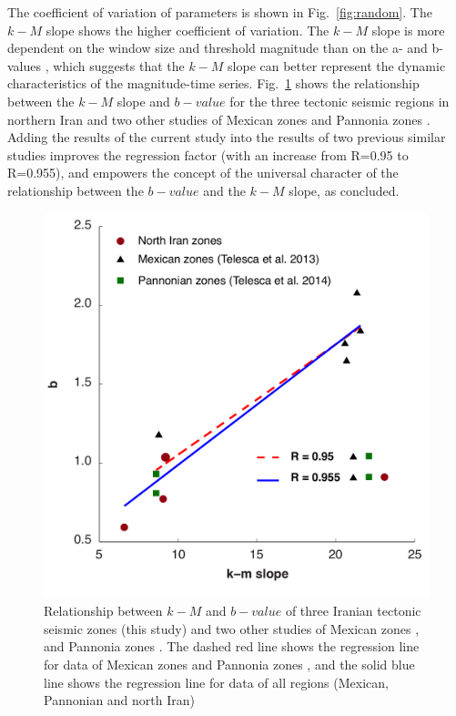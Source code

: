 \noindent
The coefficient of variation of parameters is shown in Fig.~\ref{fig:random}. The  $k-M$  slope shows the higher coefficient of variation. The  $k-M$  slope is more dependent on the window size and threshold magnitude than  on the a-  and  b-values , which suggests that  the $k-M$  slope can better represent the dynamic characteristics of the magnitude-time series. 
 \noindent
 Fig.~\ref{fig:regression} shows the relationship between the  $k-M$  slope and $b-value$ for the three tectonic seismic regions in northern Iran and two other studies of Mexican zones  \citep{Telesca2013}  and Pannonia zones  \citep{Telesca2014}. Adding the results of the current study into the results of two previous similar studies improves the regression factor (with an increase from R=0.95 to R=0.955), and empowers the concept of the universal character of the relationship between the  $b-value$  and the  $k-M$  slope, as  \citet{Telesca2014} concluded. 
 
\begin{figure} [ht]
\centering
\includegraphics[scale=0.3]{figures/pdf/Figure07.pdf} 
\caption{ Relationship between $k-M$ and $b-value$ of three Iranian tectonic seismic zones (this study) and two other studies of Mexican zones \citep{Telesca2013}, and Pannonia zones \citep{Telesca2014}. The dashed red line shows the regression line for data of  Mexican zones and Pannonia zones \citep{Telesca2014}, and the solid blue line shows the regression line for data of all regions (Mexican, Pannonian and north Iran)}
\label{fig:regression}
\end{figure}

